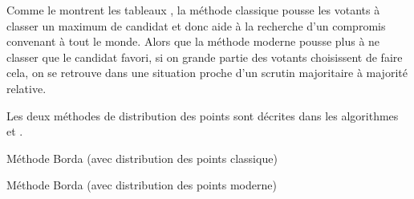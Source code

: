 \documentclass[../report]{subfiles}
\begin{document}
  Comme le montrent les tableaux , la méthode classique pousse 
  les votants à classer un maximum de candidat et donc aide à la recherche d'un 
  compromis convenant à tout le monde.
  Alors que la méthode moderne pousse plus à ne classer que le candidat favori, si on grande
  partie des votants choisissent de faire cela, on se retrouve dans une situation proche 
  d'un scrutin majoritaire à majorité relative.

  Les deux méthodes de distribution des points sont décrites dans les algorithmes  et .

  \begin{algorithm}
    \caption{Méthode Borda (avec distribution des points classique)}%
    \label{scrutin:borda-classique}
    \begin{algorithmic}[1]
      \ENDFOR{}
      \ENDFOR{}
  \end{algorithmic}
  \end{algorithm}
  
  \begin{algorithm}
    \caption{Méthode Borda (avec distribution des points moderne)}%
    \label{scrutin:borda-moderne}
    \begin{algorithmic}[1]
      \ENDFOR{}
      \ENDFOR{}
    \end{algorithmic}
  \end{algorithm}
\end{document}
